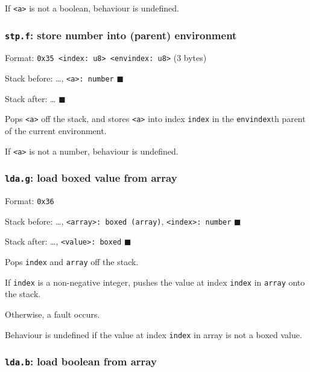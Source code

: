 If \texttt{\textless{}a\textgreater{}} is not a boolean, behaviour is
undefined.

\subsubsection{\texorpdfstring{\texttt{stp.f}: store number into
(parent) environment}{stp.f: store number into (parent) environment}}

Format:
\texttt{0x35\ \textless{}index:\ u8\textgreater{}\ \textless{}envindex:\ u8\textgreater{}}
(3 bytes)

Stack before: \ldots, \texttt{\textless{}a\textgreater{}:\ number}
\(\blacksquare\)

Stack after: \ldots{} \(\blacksquare\)

Pops \texttt{\textless{}a\textgreater{}} off the stack, and stores
\texttt{\textless{}a\textgreater{}} into index \texttt{index} in the
\texttt{envindex}th parent of the current environment.

If \texttt{\textless{}a\textgreater{}} is not a number, behaviour is
undefined.

\subsubsection{\texorpdfstring{\texttt{lda.g}: load boxed value from
array}{lda.g: load boxed value from array}}

Format: \texttt{0x36}

Stack before: \ldots,
\texttt{\textless{}array\textgreater{}:\ boxed\ (array)},
\texttt{\textless{}index\textgreater{}:\ number} \(\blacksquare\)

Stack after: \ldots, \texttt{\textless{}value\textgreater{}:\ boxed}
\(\blacksquare\)

Pops \texttt{index} and \texttt{array} off the stack.

If \texttt{index} is a non-negative integer, pushes the value at index
\texttt{index} in \texttt{array} onto the stack.

Otherwise, a fault occurs.

Behaviour is undefined if the value at index \texttt{index} in array is
not a boxed value.

\subsubsection{\texorpdfstring{\texttt{lda.b}: load boolean from
array}{lda.b: load boolean from array}}

